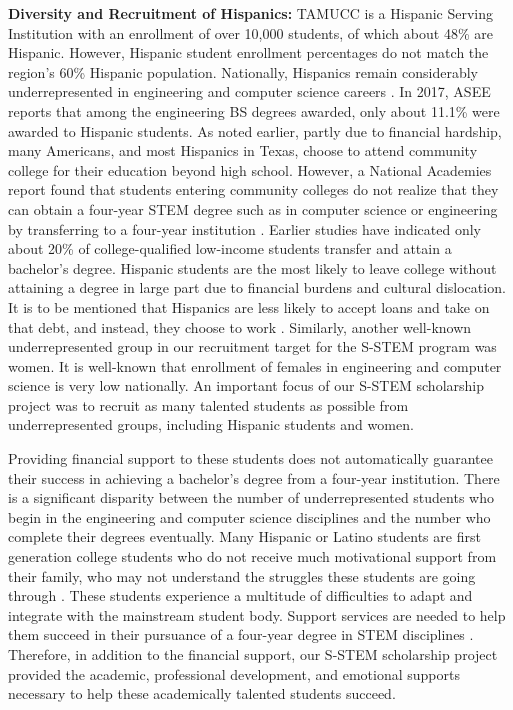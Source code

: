 \documentclass{article}
\begin{document}
\textbf{Diversity and Recruitment of Hispanics:} TAMUCC is a Hispanic Serving Institution with an enrollment of over 10,000 students, of which about 48\% are Hispanic.  However, Hispanic student enrollment percentages do not match the region’s 60\% Hispanic population.  Nationally, Hispanics remain considerably underrepresented in engineering and computer science careers \cite{roy2019engineering}. In 2017, ASEE reports that among the engineering BS degrees awarded, only about 11.1\% were awarded to Hispanic students. As noted earlier, partly due to financial hardship, many Americans, and most Hispanics in Texas, choose to attend community college for their education beyond high school. However, a National Academies report found that students entering community colleges do not realize that they can obtain a four-year STEM degree such as in computer science or engineering by transferring to a four-year institution \cite{academies2010rising}. Earlier studies have indicated only about 20\% of college-qualified low-income students transfer and attain a bachelor’s degree. Hispanic students are the most likely to leave college without attaining a degree in large part due to financial burdens and cultural dislocation.  It is to be mentioned that Hispanics are less likely to accept loans and take on that debt, and instead, they choose to work \cite{varorta2007latino}. Similarly, another well-known underrepresented group in our recruitment target for the S-STEM program was women. It is well-known that enrollment of females in engineering and computer science is very low nationally. An important focus of our S-STEM scholarship project was to recruit as many talented students as possible from underrepresented groups, including Hispanic students and women.

Providing financial support to these students does not automatically guarantee their success in achieving a bachelor’s degree from a four-year institution.  There is a significant disparity between the number of underrepresented students who begin in the engineering and computer science disciplines and the number who complete their degrees eventually. Many Hispanic or Latino students are first generation college students who do not receive much motivational support from their family, who may not understand the struggles these students are going through \cite{dennis2005role}. These students experience a multitude of difficulties to adapt and integrate with the mainstream student body. Support services are needed to help them succeed in their pursuance of a four-year degree in STEM disciplines \cite{chemers, gershenfeld, yomtov2017peer, tinto2002learned, kalevitch2016building}. Therefore, in addition to the financial support, our S-STEM scholarship project provided the academic, professional development, and emotional supports necessary to help these academically talented students succeed.   
\end{document}
